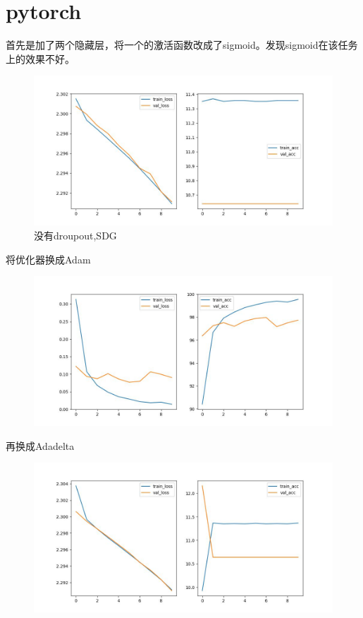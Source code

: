 \documentclass[UTF8]{ctexart}
\begin{document}
\section{pytorch}
首先是加了两个隐藏层，将一个的激活函数改成了sigmoid。发现sigmoid在该任务上的效果不好。
\begin{figure}[H]
\centering
\includegraphics[scale=0.5]{no_dropout_SDG.jpg}
\caption{没有droupout,SDG}
\end{figure}
将优化器换成Adam
\begin{figure}[H]
\centering
\includegraphics[scale=0.5]{no_dropout.jpg}
\end{figure}

再换成Adadelta
\begin{figure}[H]
\centering
\includegraphics[scale=0.5]{no_dropout_Adadelta.jpg}
\end{figure}
\end{document}
